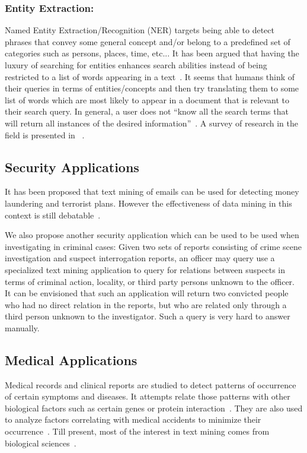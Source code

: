 \documentclass[a4,12pt]{report}
\begin{document}
	\subsubsection{Entity Extraction:} Named Entity Extraction/Recognition (NER) targets being able to detect phrases that convey some general concept
		and/or belong to a predefined set of categories such as persons, places, time, etc... It has been argued that having the luxury of searching
		for entities enhances search abilities instead of being restricted to a list of words appearing in a text~\cite{basis:06}. 
		It seems that humans think of their
		queries in terms of entities/concepts and then try translating them to some list of words which are most likely to appear in a document that
		is relevant to their search query. In general, a user does not ``know all the search terms that will return all instances of the desired
		information''~\cite{basis:06}. A survey of research in the field is presented in ~\cite{Nadeau:07}. 
	
\subsection{Security Applications} 
	It has been proposed that text mining of emails can be used for detecting money laundering and 
	terrorist plans. However the effectiveness of data mining in this context is still debatable~\cite{Jonas:06,Federici:07}.
	
	We also propose another security application which can be used to be used when investigating in criminal cases:
	Given two sets of reports consisting of crime scene investigation and suspect interrogation reports, 
	an officer may query use a specialized text mining application to query for relations between suspects in terms of 
	criminal action, locality, or third party persons unknown to the officer.
	It can be envisioned that such an application will return two convicted people who had no direct relation
	in the reports, but who are related only through a third person unknown to the investigator. 
	Such a query is very hard to answer manually.

\subsection{Medical Applications} 
	Medical records and clinical reports are studied to detect
	patterns of occurrence of certain symptoms and diseases. It attempts relate those patterns with
	other biological factors such as certain 
	genes or protein interaction~\cite{blaschke:99, Krallinger:05, Rebholz-Schuhmann:07, Cohen:08, Tsuruoka:08}.
	They are also used to analyze factors correlating with medical accidents to minimize their occurrence~\cite{Kimura:08}.
	Till present, most of the interest in text mining comes from biological sciences~\cite{Giannopoulou:08}.
\end{document}
